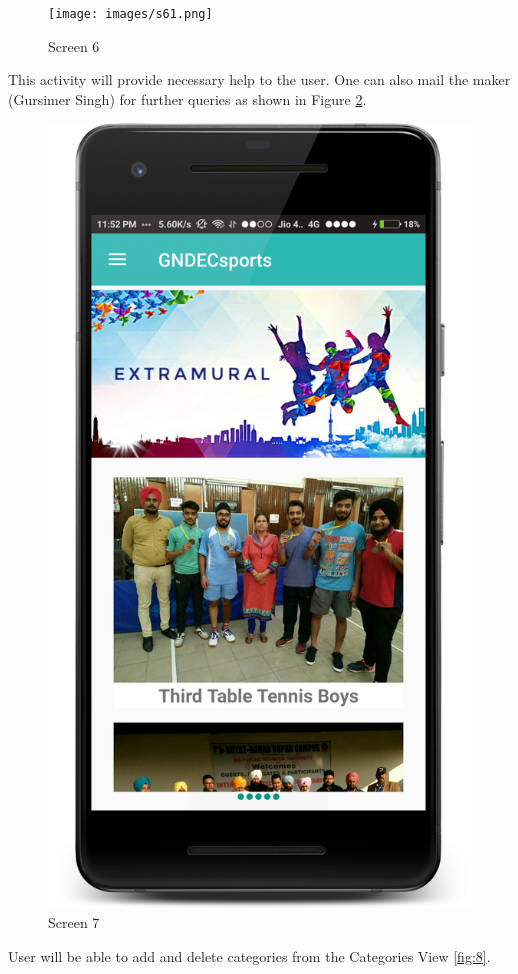 \begin{figure}[ht]
\centering
\texttt{[image: images/s61.png]}
\caption{Screen 6}
\label{fig:6}
\end{figure}

\noindent This activity will provide necessary help to the user. One can also mail the maker
(Gursimer Singh) for further queries as shown in Figure \ref{fig:7}. 

\begin{figure}[ht]
\centering
\includegraphics[scale=0.38]{images/s7.png}
\caption{Screen 7}
\label{fig:7}
\end{figure}
\noindent User will be able to add and delete categories from the Categories View \ref{fig:8}. 

